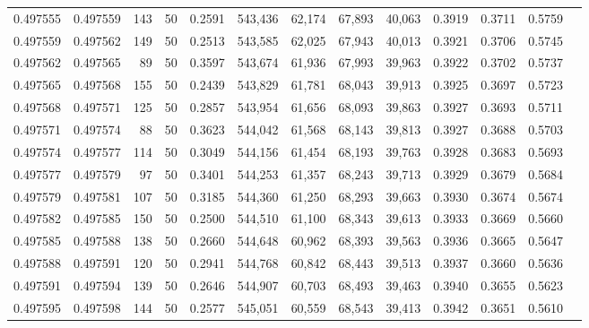 \begin{tabular}{rrrrrrrrrrrrr}
0.497555 & 0.497559 &   143 &  50 &                                     0.2591 & 543,436 &  62,174 &  67,893 &  40,063 & 0.3919 & 0.3711 & 0.5759 \\
0.497559 & 0.497562 &   149 &  50 &                                     0.2513 & 543,585 &  62,025 &  67,943 &  40,013 & 0.3921 & 0.3706 & 0.5745 \\
0.497562 & 0.497565 &    89 &  50 &                                     0.3597 & 543,674 &  61,936 &  67,993 &  39,963 & 0.3922 & 0.3702 & 0.5737 \\
0.497565 & 0.497568 &   155 &  50 &                                     0.2439 & 543,829 &  61,781 &  68,043 &  39,913 & 0.3925 & 0.3697 & 0.5723 \\
0.497568 & 0.497571 &   125 &  50 &                                     0.2857 & 543,954 &  61,656 &  68,093 &  39,863 & 0.3927 & 0.3693 & 0.5711 \\
0.497571 & 0.497574 &    88 &  50 &                                     0.3623 & 544,042 &  61,568 &  68,143 &  39,813 & 0.3927 & 0.3688 & 0.5703 \\
0.497574 & 0.497577 &   114 &  50 &                                     0.3049 & 544,156 &  61,454 &  68,193 &  39,763 & 0.3928 & 0.3683 & 0.5693 \\
0.497577 & 0.497579 &    97 &  50 &                                     0.3401 & 544,253 &  61,357 &  68,243 &  39,713 & 0.3929 & 0.3679 & 0.5684 \\
0.497579 & 0.497581 &   107 &  50 &                                     0.3185 & 544,360 &  61,250 &  68,293 &  39,663 & 0.3930 & 0.3674 & 0.5674 \\
0.497582 & 0.497585 &   150 &  50 &                                     0.2500 & 544,510 &  61,100 &  68,343 &  39,613 & 0.3933 & 0.3669 & 0.5660 \\
0.497585 & 0.497588 &   138 &  50 &                                     0.2660 & 544,648 &  60,962 &  68,393 &  39,563 & 0.3936 & 0.3665 & 0.5647 \\
0.497588 & 0.497591 &   120 &  50 &                                     0.2941 & 544,768 &  60,842 &  68,443 &  39,513 & 0.3937 & 0.3660 & 0.5636 \\
0.497591 & 0.497594 &   139 &  50 &                                     0.2646 & 544,907 &  60,703 &  68,493 &  39,463 & 0.3940 & 0.3655 & 0.5623 \\
0.497595 & 0.497598 &   144 &  50 &                                     0.2577 & 545,051 &  60,559 &  68,543 &  39,413 & 0.3942 & 0.3651 & 0.5610 \\

\end{tabular}
